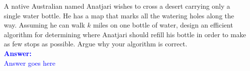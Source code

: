 \item{}
A native Australian named Anatjari wishes to cross a desert carrying only a
single water bottle. He has a map that marks all the watering holes along the
way. Assuming he can walk $k$ miles on one bottle of water, design an efficient
algorithm for determining where Anatjari should refill his bottle in order to
make as few stops as possible. Argue why your algorithm is correct.
\\[12pt]
\ifanswers
\textcolor{blue}{
\textbf{Answer:}\\[6pt]
Answer goes here
}
\newpage
\fi
